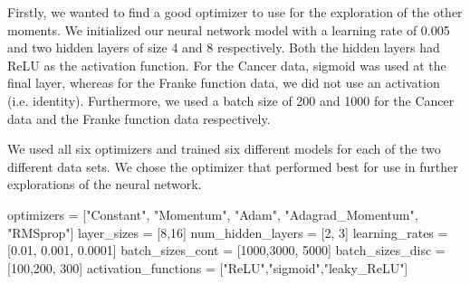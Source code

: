 Firstly, we wanted to find a good optimizer to use for the exploration of the other moments. 
We initialized our neural network model with a learning rate of 0.005 and two hidden layers of size 4 and 8 respectively. 
Both the hidden layers had ReLU as the activation function. 
For the Cancer data, sigmoid was used at the final layer, whereas for the Franke function data, we did not use an activation (i.e. identity). 
Furthermore, we used a batch size of 200 and 1000 for the Cancer data and the Franke function data respectively. 

We used all six optimizers and trained six different models for each of the two different data sets. 
We chose the optimizer that performed best for use in further explorations of the neural network. 



optimizers = ["Constant", "Momentum", "Adam", "Adagrad_Momentum", "RMSprop"]
layer_sizes = [8,16]
num_hidden_layers = [2, 3]
learning_rates = [0.01, 0.001, 0.0001]
batch_sizes_cont = [1000,3000, 5000]
batch_sizes_disc = [100,200, 300]
activation_functions = ["ReLU","sigmoid","leaky_ReLU"]